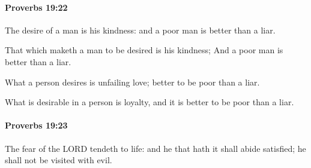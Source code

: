 		\paragraph{Proverbs 19:22} %
			\label{PROVERBS-19-22}

			The desire of a man is his kindness: and a poor man is better than a liar.

			\begin{versebox}
					\item[BHS] 
					\item[ASV] That which maketh a man to be desired is his kindness; And a poor man is better than a liar.
					\item[NIV] What a person desires is unfailing love; better to be poor than a liar.
					\item[NRSV] What is desirable in a person is loyalty, and it is better to be poor than a liar.
			\end{versebox}

		\paragraph{Proverbs 19:23} %
			\label{PROVERBS-19-23}

			The fear of the LORD tendeth to life: and he that hath it shall abide satisfied; he shall not be visited with evil.

